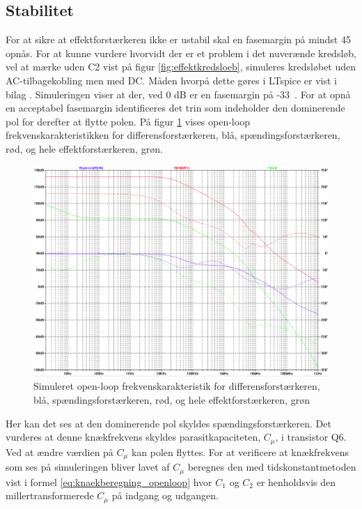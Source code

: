 \subsection{Stabilitet}
\label{effektforstaerker-stabilitet}

For at sikre at effektforstærkeren ikke er ustabil skal en fasemargin på mindst 45\degree~ opnås. For at kunne vurdere hvorvidt der er et problem i det nuverænde kredsløb, vel at mærke uden C2 vist på figur \ref{fig:effektkredsloeb}, simuleres kredsløbet uden AC-tilbagekobling men med DC. Måden hvorpå dette gøres i LTspice er vist i bilag . Simuleringen viser at der, ved 0 dB er en fasemargin på -33\degree~. For at opnå en acceptabel fasemargin identificeres det trin som indeholder den dominerende pol for derefter at flytte polen. På figur \ref{fig:frek_openloop_ukorigeret} vises open-loop frekvenskarakteristikken for differensforstærkeren, blå, spændingsforstærkeren, rød, og hele effektforstærkeren, grøn. 


\begin{figure}[h]
\centering
\includegraphics[width=\textwidth]{teknisk/effektforstaerker/frek_ukorrigeret_stabilitet.png}
\caption{Simuleret open-loop frekvenskarakteristik for differensforstærkeren, blå, spændingsforstærkeren, rød, og hele effektforstærkeren, grøn}
\label{fig:frek_openloop_ukorigeret}
\end{figure}

Her kan det ses at den dominerende pol skyldes spændingsforstærkeren. Det vurderes at denne knækfrekvens skyldes parasitkapaciteten, $C_\mu$, i transistor Q6. Ved at ændre værdien på $C_\mu$ kan polen flyttes. For at verificere at knækfrekvens som ses på simuleringen bliver lavet af $C_\mu$ beregnes den med tidskonstantmetoden vist i formel \ref{eq:knaekberegning_openloop}  hvor $C_1$ og $C_2$ er henholdsvis den millertransformerede $C_\mu$ på indgang og udgangen.

